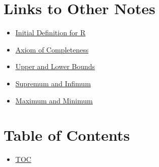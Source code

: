 \section*{Links to Other Notes}
\begin{itemize}
  \item \hyperref[202501180703]{Initial Definition for R}
  \item \hyperref[202501180727]{Axiom of Completeness}
  \item \hyperref[202501180734]{Upper and Lower Bounds}
  \item \hyperref[202501180743]{Supremum and Infimum}
  \item \hyperref[202501181241]{Maximum and Minimum}
\end{itemize}

\section*{Table of Contents}

\begin{itemize}
  \item \hyperref[toc]{TOC}
\end{itemize}

